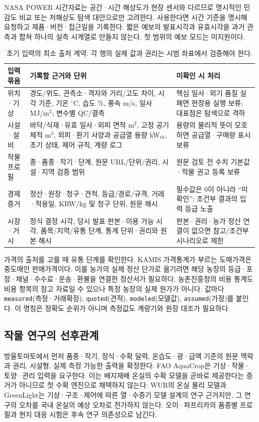 \documentclass[11pt,a4paper]{article}
\begin{document}
NASA POWER 시간자료는 공간·시간 해상도가 현장 센서와 다르므로 명시적인 민감도 비교 또는 저해상도 탐색 대안으로만 고려한다. 사용한다면 시간 기준을 명시해 요청하고 제품·버전·접근일을 기록한다\cite{nasa-hourly}. 짧은 예보의 발표시각과 유효시각을 과거 관측과 합쳐 하나의 실측 시계열로 만들지 않는다. 첫 범위의 예보 모드는 미지원이다.

\begin{table}[htbp]
\centering\small
\caption{초기 입력의 최소 출처 계약. 각 행의 실제 값과 권리는 시범 좌표에서 검증해야 한다.}
\begin{tabularx}{\textwidth}{p{2.35cm}YY}
\toprule
입력 묶음 & 기록할 근거와 단위 & 미확인 시 처리 \\
\midrule
위치·기상 & 경도/위도, 관측소·격자와 거리/고도 차이, 시각 기준, 기온 $^\circ$C, 습도 \%, 풍속 m/s, 일사 MJ/m$^2$; 변수별 QC/결측 & 핵심 일사·외기 품질 실패면 현장용 실행 보류; 대표점은 탐색으로 격하 \\
시설·설비 & 바닥/식재·유효 일사·외피 면적 m$^2$, 고정 공기 체적 m$^3$, 외피·환기 사양과 공급열 용량 kW$_{th}$, 초기 상태, 제어 규칙, 계량 로그 & 용량의 물리적 뜻이 모호하면 공급열·구매량 표시 보류 \\
작물 프로필 & 종·품종·작기·단계, 원문 URL/단위/권리, 시설·지역 검증 범위 & 원문 검토 전 수치 기본값·작물 권고 등록 보류 \\
경제 증거 & 정산·원장·청구·견적, 등급/경로/규격, 거래·적용일, KRW/kg 및 청구 단위, 원문 해시 & 필수값은 0이 아니라 ``미확인''; 조건부 결과의 입력 등급 노출 \\
시장·거시 & 정식 결정 시각, 당시 발표 판본·이용 가능 시각, 품목/지역/유통 단계, 통계 단위·권리와 원본 해시 & 판본·권리·농가 정산 연결이 없으면 참고/조건부 시나리오로 제한 \\
\bottomrule
\end{tabularx}
\end{table}

가격의 출처를 고를 때 유통 단계를 확인한다. KAMIS 가격통계가 부르는 도매가격은 중도매인 판매가격이다\cite{kamis}. 이를 농가의 실제 정산 단가로 옮기려면 해당 농장의 등급·포장·채널·수수료·운송·환불을 연결한 정산서가 필요하다. 농촌진흥청의 비용 통계도 비용 항목의 참고 자료일 수 있으나 특정 농장의 실제 원가가 아니다. 값마다 \texttt{measured}(측정·거래확정), \texttt{quoted}(견적), \texttt{modeled}(모델값), \texttt{assumed}(가정)를 붙인다. 이 명칭은 정확도 순위가 아니며 측정값도 계량기와 원장 대조가 필요하다.

\subsection{작물 연구의 선후관계}
방울토마토에서 먼저 품종·작기, 정식·수확 달력, 온습도·광·급액 기준의 원문 맥락과 권리, 시설형, 실제 측정 가능한 출력을 확정한다. FAO AquaCrop은 기상·작물·토양·관리 입력을 요구한다\cite{fao-aquacrop}. 이는 배지재배 온실의 수확 모델을 곧바로 제공한다는 증거가 아니므로 첫 수확 엔진으로 채택하지 않는다. WUR의 온실 물리 모델과 GreenLight는 기상·구조·제어에 따른 열·수증기 모델 설계의 연구 근거지만, 그 연구의 오차를 국내 온실의 예상 오차로 전가하지 않는다\cite{wur-bot,wur-greenlight}. 오이·파프리카의 품종별 프로필과 현지 대응 시험은 후속 연구 의존성으로 남긴다.
\end{document}
